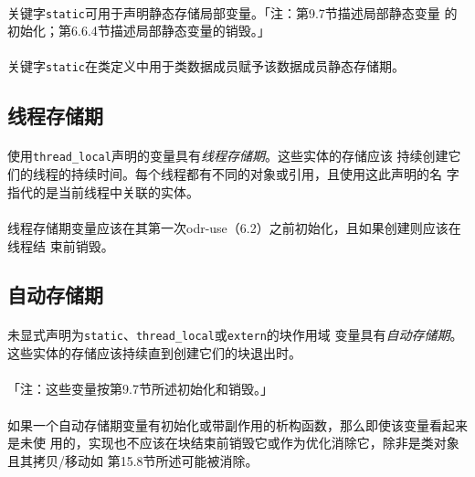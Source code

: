 \paragraph{}
关键字\texttt{static}可用于声明静态存储局部变量。「注：第9.7节描述局部静态变量
的初始化；第6.6.4节描述局部静态变量的销毁。」

\paragraph{}
关键字\texttt{static}在类定义中用于类数据成员赋予该数据成员静态存储期。

\subsection{线程存储期}
\paragraph{}
使用\texttt{thread\_local}声明的变量具有\textit{线程存储期}。这些实体的存储应该
持续创建它们的线程的持续时间。每个线程都有不同的对象或引用，且使用这此声明的名
字指代的是当前线程中关联的实体。

\paragraph{}
线程存储期变量应该在其第一次odr-use（6.2）之前初始化，且如果创建则应该在线程结
束前销毁。

\subsection{自动存储期}
\paragraph{}
未显式声明为\texttt{static}、\texttt{thread\_local}或\texttt{extern}的块作用域
变量具有\textit{自动存储期}。这些实体的存储应该持续直到创建它们的块退出时。

\paragraph{}
「注：这些变量按第9.7节所述初始化和销毁。」

\paragraph{}
如果一个自动存储期变量有初始化或带副作用的析构函数，那么即使该变量看起来是未使
用的，实现也不应该在块结束前销毁它或作为优化消除它，除非是类对象且其拷贝/移动如
第15.8节所述可能被消除。

